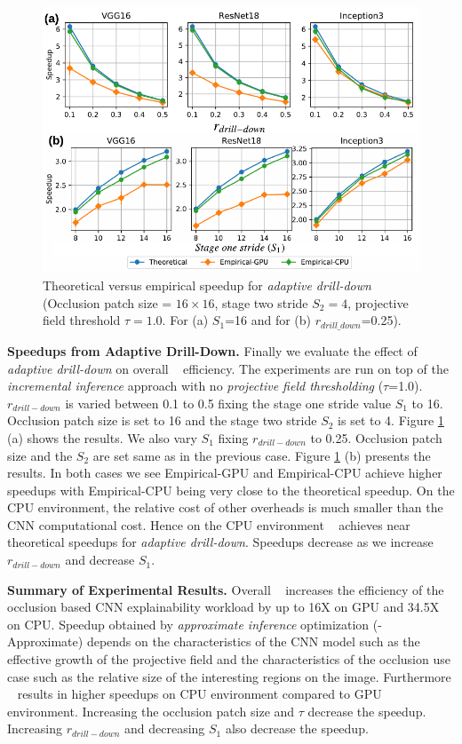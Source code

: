 \begin{figure}[t]
\includegraphics[width=\columnwidth]{images/5_2_3_edited}
\caption{Theoretical versus empirical speedup for \textit{adaptive drill-down} (Occlusion patch size = $16 \times 16$, stage two stride $S_2=4$, projective field threshold $\tau=1.0$. For (a) $S_1$=16 and for (b) $r_{drill\_down}$=0.25).}
\label{fig:5_2_3_edited}
\end{figure}

\vspace{2mm}
\noindent \textbf{Speedups from Adaptive Drill-Down.} Finally we evaluate the effect of \textit{adaptive drill-down} on overall \system~ efficiency.
The experiments are run on top of the \textit{incremental inference} approach with no \textit{projective field thresholding} ($\tau$=1.0).
$r_{drill-down}$ is varied between 0.1 to 0.5 fixing the stage one stride value $S_1$ to 16.
Occlusion patch size is set to 16 and the stage two stride $S_2$ is set to 4.
Figure \ref{fig:5_2_3_edited} (a) shows the results.
We also vary $S_1$ fixing $r_{drill-down}$ to 0.25.
Occlusion patch size and the $S_2$ are set same as in the previous case.
Figure \ref{fig:5_2_3_edited} (b) presents the results.
In both cases we see Empirical-GPU and Empirical-CPU achieve higher speedups with Empirical-CPU being very close to the theoretical speedup.
On the CPU environment, the relative cost of other overheads is much smaller than the CNN computational cost.
Hence on the CPU environment \system~ achieves near theoretical speedups for \textit{adaptive drill-down}.
Speedups decrease as we increase $r_{drill-down}$ and decrease $S_1$.

\vspace{2mm}
\noindent \textbf{Summary of Experimental Results.} Overall \system~ increases the efficiency of the occlusion based CNN explainability workload by up to 16X on GPU and 34.5X on CPU.
Speedup obtained by \textit{approximate inference} optimization (\system-Approximate) depends on the characteristics of the CNN model such as the effective growth of the projective field and the characteristics of the occlusion use case such as the relative size of the interesting regions on the image.
Furthermore \system~ results in higher speedups on CPU environment compared to GPU environment.
Increasing the occlusion patch size and $\tau$ decrease the speedup.
Increasing $r_{drill-down}$ and decreasing $S_1$ also decrease the speedup.

